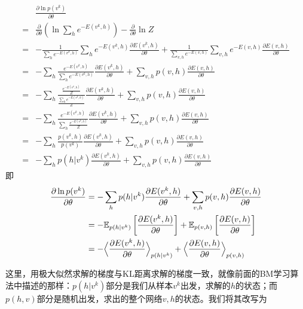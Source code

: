             \begin{align*}
            &\frac{\partial \ln p(v^k)}{\partial \theta}\\
            ={}& \frac{\partial }{\partial \theta} \left( \ln \sum_he^{-E(v^k,h)} \right)  - \frac{\partial }{\partial \theta} \ln Z\\
            ={}&-\frac{1}{\sum_he^{-E(v^k,h)}}\sum_he^{-E(v^k,h)}\frac{\partial E(v^k,h)}{\partial \theta} + \frac{1}{\sum_{v,h} e^{-E(v,h)}}\sum_{v,h} e^{-E(v,h)}\frac{\partial E(v,h)}{\partial \theta}\\
            ={}&-\sum_h\frac{e^{-E(v^k,h)}}{\sum_he^{-E(v^k,h)}}\frac{\partial E(v^k,h)}{\partial \theta} + \sum_{v,h}p(v,h)\frac{\partial E(v,h)}{\partial \theta}\\
            ={}&-\sum_h\frac{\frac{e^{-E(v^k,h)}}{Z}}{\frac{\sum_he^{-E(v^k,h)}}{Z}}\frac{\partial E(v^k,h)}{\partial \theta} + \sum_{v,h}p(v,h)\frac{\partial E(v,h)}{\partial \theta}\\
            ={}&- \sum_h \frac{e^{-E(v^k,h)}}{\sum_h\frac{e^{-E(v^k,h)}}{Z}}\frac{\partial E(v^k,h)}{\partial \theta} + \sum_{v,h}p(v,h)\frac{\partial E(v,h)}{\partial \theta}\\
            ={}& -\sum_h \frac{p(v^k,h)}{p(v^k)}\frac{\partial E(v^k,h)}{\partial \theta} + \sum_{v,h}p(v,h)\frac{\partial E(v,h)}{\partial \theta}\\
            ={}& - \sum_h p(h|v^k)\frac{\partial E(v^k,h)}{\partial \theta} + \sum_{v,h}p(v,h)\frac{\partial E(v,h)}{\partial \theta}
            \end{align*}
            即
            \begin{align}
            \label{BM极大似然估计梯度}
            \frac{\partial \ln p(v^k)}{\partial \theta} & = -\sum_h p(h|v^k)\frac{\partial E(v^k,h)}{\partial \theta} + \sum_{v,h}p(v,h)\frac{\partial E(v,h)}{\partial \theta} \\
            & =- \mathbb{E}_{p(h|v^k)} \left[ \frac{\partial E(v^k,h)}{\partial \theta} \right] + \mathbb{E}_{p(v,h)} \left[ \frac{\partial E(v,h)}{\partial \theta}  \right]\notag\\
            & =-\Big<\frac{\partial E(v^k,h)}{\partial \theta}  \Big>_{p(h|v^k)} + \Big<\frac{\partial E(v,h)}{\partial \theta}  \Big>_{p(v,h)} \notag
            \end{align}
            \par
            这里，用极大似然求解的梯度与KL距离求解的梯度一致，就像前面的BM学习算法中描述的那样：$p(h|v^k)$部分是我们从样本$v^k$出发，求解的$h$的状态；而$p(h,v)$部分是随机出发，求出的整个网络$v,h$的状态。我们将其改写为
